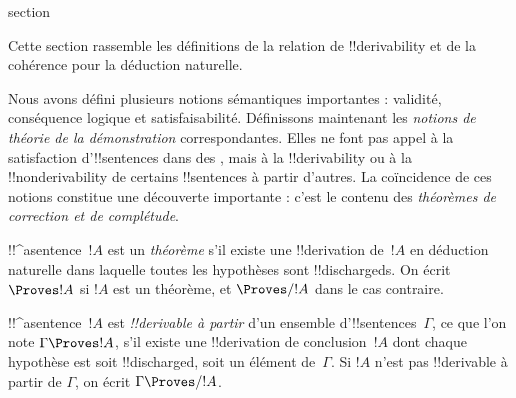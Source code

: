 \documentclass[11pt,a4paper,openany]{memoir}
\begin{document}
\endgroup




\begingroup
\expandafter\def\csname ol@sectioncs\endcsname{section}
\def\olfilename{proof-theoretic-notions}


      {}
      {}


\begin{editorial}
Cette section rassemble les définitions de la relation de
!!{derivability} et de la cohérence pour la déduction naturelle.
\end{editorial}

\begin{explain}
Nous avons défini plusieurs notions sémantiques importantes :
validité, conséquence logique et satisfaisabilité. Définissons
maintenant les \emph{notions de théorie de la démonstration}
correspondantes. Elles ne font pas appel à la satisfaction
d'!!{sentence}s dans des ,
mais à la !!{derivability} ou à la !!{nonderivability} de certains
!!{sentence}s à partir d'autres. La coïncidence de ces notions
constitue une découverte importante : c'est le contenu des
\emph{théorèmes de correction et de complétude}.
\end{explain}

\begin{defn}[Théorèmes]
!!^a{sentence}~$!A$ est un \emph{théorème} s'il existe une
!!{derivation} de~$!A$ en déduction naturelle dans laquelle toutes
les hypothèses sont !!{discharged}s. On écrit $\Proves !A$ si
$!A$ est un théorème, et $\Proves/ !A$ dans le cas contraire.
\end{defn}

\begin{defn}[!!^{derivability}]
!!^a{sentence}~$!A$ est \emph{!!{derivable} à partir} d'un ensemble
d'!!{sentence}s~$\Gamma$, ce que l'on note $\Gamma \Proves !A$,
s'il existe une !!{derivation} de conclusion~$!A$ dont chaque
hypothèse est soit !!{discharged}, soit un élément de~$\Gamma$.
Si $!A$ n'est pas !!{derivable} à partir de $\Gamma$, on écrit
$\Gamma \Proves/ !A$.
\end{defn}
\end{document}

